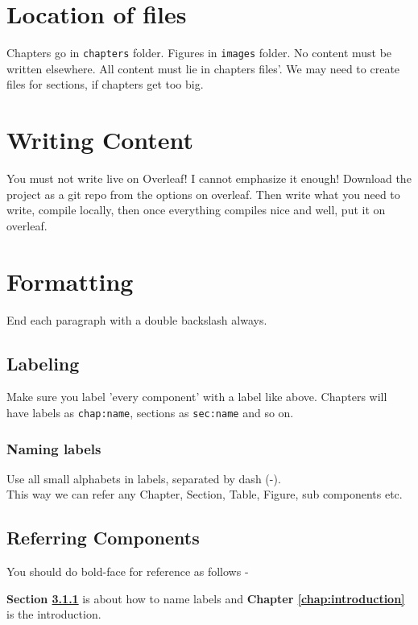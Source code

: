 \section{Location of files}
\label{sec:location-files}
Chapters go in \texttt{chapters} folder. Figures in \texttt{images} folder. No content must be written elsewhere. All content must lie in chapters files'. We may need to create files for sections, if chapters get too big.

\section{Writing Content}
\label{sec:content}
You must not write live on Overleaf! I cannot emphasize it enough! Download the project as a git repo from the options on overleaf. Then write what you need to write, compile locally, then once everything compiles nice and well, put it on overleaf.

\section{Formatting}
\label{sec:formatting}

End each paragraph with a double backslash always.\\

\subsection{Labeling}
\label{subsec:labeling}
Make sure you label 'every component' with a label like above. Chapters will have labels as \texttt{chap:name}, sections as \texttt{sec:name} and so on.

\subsubsection{Naming labels}
\label{subsubsec:naming-labels}
Use all small alphabets in labels, separated by dash (-).\\

This way we can refer any Chapter, Section, Table, Figure, sub components etc.

\subsection{Referring Components}
\label{subsec:referring-components}

You should do bold-face for reference as follows -

\textbf{Section \ref{subsubsec:naming-labels}} is about how to name labels and \textbf{Chapter \ref{chap:introduction}} is the introduction.

